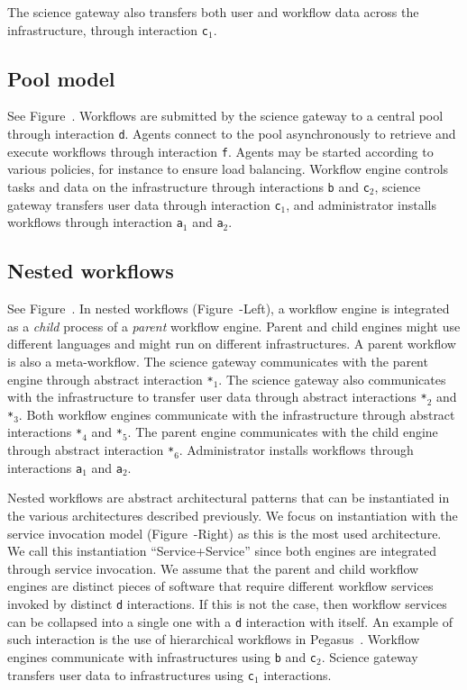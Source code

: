 \documentclass[preprint,3p,twocolumn]{elsarticle}
\newcommand{\correction}[1]{\color{blue}#1\color{black}\xspace}
\begin{document}
The science gateway also transfers both user and workflow data across
the infrastructure, through interaction \texttt{c$_1$}.
\subsection{Pool model}
\label{sec:pool}
See Figure~. Workflows are submitted by the
science gateway to a central pool through interaction
\texttt{d}. Agents connect to the pool asynchronously to retrieve and
execute workflows through interaction \texttt{f}. Agents may be
started according to various policies, for instance to ensure load
balancing. Workflow engine controls tasks and data on the
infrastructure through interactions \texttt{b} and \texttt{c$_2$},
science gateway transfers user data through interaction
\texttt{c$_1$}, and administrator installs workflows through
interaction \texttt{a$_1$} and \texttt{a$_2$}.

\subsection{Nested workflows}

See Figure~. In nested workflows
(Figure~-Left), a workflow engine is integrated
as a \emph{child} process of a \emph{parent} workflow engine. Parent
and child engines might use different languages and might run on
different infrastructures. A parent workflow is also a
meta-workflow. The science gateway communicates with the parent engine
through abstract interaction \texttt{*$_1$}. The science gateway also
communicates with the infrastructure to transfer user data through
abstract interactions \texttt{*$_2$} and \texttt{*$_3$}. Both workflow
engines communicate with the infrastructure through abstract
interactions \texttt{*$_4$} and \texttt{*$_5$}. The parent engine
communicates with the child engine through abstract interaction
\texttt{*$_6$}. Administrator installs workflows through interactions
\texttt{a$_1$} and \texttt{a$_2$}.

Nested workflows are abstract architectural patterns that can be
instantiated in the various architectures described previously. We
focus on instantiation with the service invocation model
(Figure~-Right) as this is the most used
architecture. \correction{We call this instantiation
  ``Service+Service'' since both engines are integrated through
  service invocation.} We assume that the parent
and child workflow engines are distinct pieces of software that
require different workflow services invoked by distinct \texttt{d}
interactions. If this is not the case, then workflow services can be
collapsed into a single one with a \texttt{d} interaction with
itself. An example of such interaction is the use of hierarchical
workflows in Pegasus~\cite{Deelman201517}.  Workflow engines
communicate with infrastructures using \texttt{b} and
\texttt{c$_2$}. Science gateway transfers user data to infrastructures
using \texttt{c$_1$} interactions.
\end{document}
